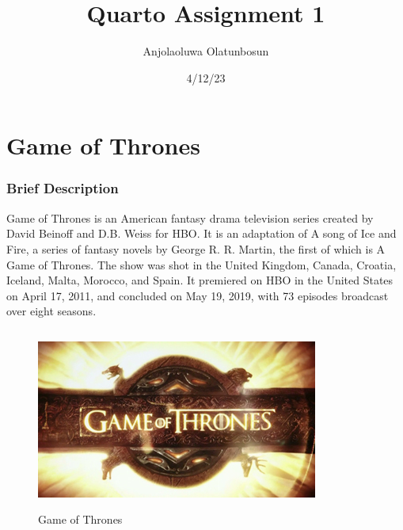 \documentclass[
  letterpaper,
  DIV=11,
  numbers=noendperiod]{scrartcl}
\title{Quarto Assignment 1}
\author{Anjolaoluwa Olatunbosun}
\date{4/12/23}
\begin{document}
\maketitle
\ifdefined\Shaded\renewenvironment{Shaded}{\begin{tcolorbox}[frame hidden, interior hidden, breakable, borderline west={3pt}{0pt}{shadecolor}, sharp corners, enhanced, boxrule=0pt]}{\end{tcolorbox}}\fi

\hypertarget{game-of-thrones}{%
\section{Game of Thrones}\label{game-of-thrones}}

\hypertarget{brief-description}{%
\subsubsection{Brief Description}\label{brief-description}}

Game of Thrones is an American fantasy drama television series created
by David Beinoff and D.B. Weiss for HBO. It is an adaptation of A song
of Ice and Fire, a series of fantasy novels by George R. R. Martin, the
first of which is A Game of Thrones. The show was shot in the United
Kingdom, Canada, Croatia, Iceland, Malta, Morocco, and Spain. It
premiered on HBO in the United States on April 17, 2011, and concluded
on May 19, 2019, with 73 episodes broadcast over eight seasons.

\begin{verbatim}
\end{verbatim}

\begin{figure}

{\centering 

\href{https://en.wikipedia.org/wiki/File:Game_of_Thrones_title_card.jpg}{\includegraphics{Game_of_Thrones_title_card.jpg}}

}

\caption{Game of Thrones}

\end{figure}
\end{document}
